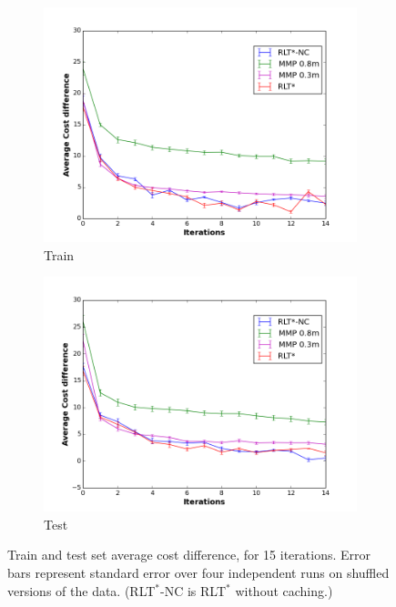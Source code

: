 \documentclass[a4paper,11pt]{report}
\begin{document}
\begin{figure}[tbh]
	\centering
      \begin{subfigure}[b]{0.45\columnwidth}

    \includegraphics[clip=true,width=1.\textwidth]{figures/cost_diff_train.png}
    \caption{Train}
    \label{fig:train_results}
  \end{subfigure}
  \begin{subfigure}[b]{0.45\columnwidth}
    \includegraphics[clip=true,width=1.\textwidth]{figures/cost_diff_val.png}
    \caption{Test}
    \label{fig:test_results}
  \end{subfigure} 

  \caption{Train and test set average cost difference, for 15 iterations. Error bars represent standard error over four independent runs on shuffled versions of the data. (RLT$^*$-NC is RLT$^*$ without caching.)}
  \label{fig:results}
\end{figure}
\end{document}
